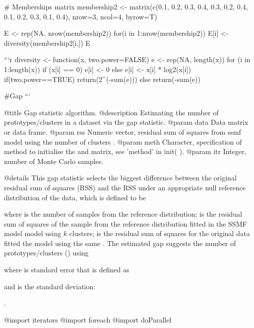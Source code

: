 \documentclass[
]{article}
\begin{document}
{{# Memberships matrix
membership2 <- matrix(c(0.1, 0.2, 0.3, 0.4, 0.3, 0.2, 0.4, 0.1, 0.2, 0.3, 0.1, 0.4), nrow=3, ncol=4, byrow=T)

E <- rep(NA, nrow(membership2))
for(i in 1:nrow(membership2)){
  E[i] <- diversity(membership2[i,])
}
E


```r
diversity <- function(x, two.power=FALSE) {
  e <- rep(NA, length(x))
  for (i in 1:length(x)) {
    if (x[i] == 0) {
      e[i] <- 0
    }
    else {
      e[i] <- x[i] * log2(x[i])
    }
  }
  if(two.power==TRUE){
    return(2^(-sum(e)))
  }
  else{
    return(-sum(e))
  }
}

#Gap
```

@title Gap statistic algorithm.
@description Estimating the number of prototypes/clusters in a dataset via the gap statistic.
@param data Data matrix or data frame.
@param rss Numeric vector, residual sum of squares from ssmf model using the number of clusters .
@param meth Character, specification of method to initialise the  and  matrix, see 'method' in init( ).
@param itr Integer, number of Monte Carlo samples.

@details
This gap statistic selects the biggest difference between the original residual sum of squares (RSS) and the RSS under an appropriate null reference distribution of the data, which is defined to be

where  is the number of samples from the reference distribution;
 is the residual sum of squares of the  sample from the reference distribution fitted in the SSMF model model using $k$ clusters;
 is the residual sum of squares for the original data  fitted the model using the same .
The estimated gap suggests the number of prototypes/clusters () using


where  is standard error that is defined as


and  is the standard deviation:

.

@import iterators
@import foreach
@import doParallel

}}
\end{document}

